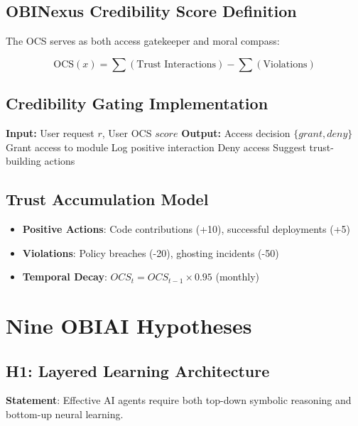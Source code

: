 \documentclass[12pt,a4paper]{article}
\begin{document}
\subsection{OBINexus Credibility Score Definition}
The OCS serves as both access gatekeeper and moral compass:

\begin{equation}
\text{OCS}(x) = \sum(\text{Trust Interactions}) - \sum(\text{Violations})
\end{equation}

\subsection{Credibility Gating Implementation}
\begin{algorithm}
\caption{OCS-Based Access Control}
\begin{algorithmic}
\STATE \textbf{Input:} User request $r$, User OCS $score$
\STATE \textbf{Output:} Access decision $\{grant, deny\}$
    \STATE Grant access to module
    \STATE Log positive interaction
\ELSE
    \STATE Deny access
    \STATE Suggest trust-building actions
\ENDIF
\end{algorithmic}
\end{algorithm}

\subsection{Trust Accumulation Model}
\begin{itemize}
    \item \textbf{Positive Actions}: Code contributions (+10), successful deployments (+5)
    \item \textbf{Violations}: Policy breaches (-20), ghosting incidents (-50)
    \item \textbf{Temporal Decay}: $OCS_t = OCS_{t-1} \times 0.95$ (monthly)
\end{itemize}

\section{Nine OBIAI Hypotheses}

\subsection{H1: Layered Learning Architecture}
\textbf{Statement}: Effective AI agents require both top-down symbolic reasoning and bottom-up neural learning.
\end{document}
